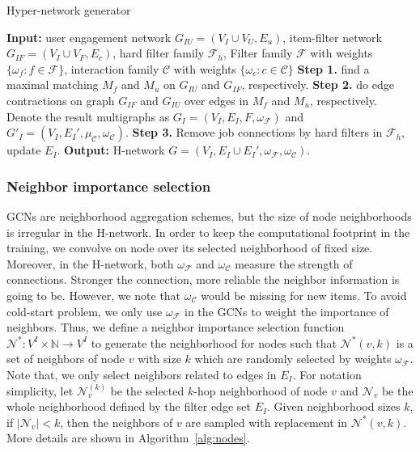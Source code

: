\documentclass[manuscript,screen,review]{acmart}
\newcommand\Fcal{\mathcal{F}}
\newcommand\Ucal{\mathcal{U}}
\newcommand{\ubf}{\bm{u}}
\newcommand{\Ccal}{\mathcal{C}}
\newcommand{\Ncal}{\mathcal{N}}
\begin{document}
\begin{algorithm}[h]
\caption{Hyper-network generator}
\begin{algorithmic}[1]\label{al:hnet}
\STATE \textbf{Input:} user engagement network $G_{IU}=(V_I\cup V_U,E_u)$,
item-filter network $G_{IF}=(V_I\cup V_F,E_c)$, 
hard filter family $\mathcal{F}_h$,
Filter family $\mathcal{F}$ with weights $\{\omega_f:f\in\mathcal{F}\}$,
interaction family $\mathcal{C}$ with weights $\{\omega_c:c\in\mathcal{C}\}$
\STATE \textbf{Step 1.} find a maximal matching $M_f$ and $M_u$ on $G_{IU}$ and $G_{IF}$, respectively.
\STATE \textbf{Step 2.} do edge contractions on graph $G_{IF}$ and $G_{IU}$ over edges in $M_f$ and $M_u$, respectively. Denote the result multigraphs as $G_I=(V_I,E_I,F,\omega_{\mathcal{F}})$ and $G'_I=(V_I,E_I',\mu_{\mathcal{C}},\omega_{\mathcal{C}})$.
\STATE \textbf{Step 3.} Remove job connections by hard filters in $\mathcal{F}_h$, update $E_I$.
\STATE 
\textbf{Output:} H-network $G=(V_I,E_I\cup E_I',\omega_{\mathcal{F}},\omega_{\mathcal{C}})$.
\end{algorithmic}
\end{algorithm}

\subsubsection{Neighbor importance selection} 
GCNs are neighborhood aggregation schemes, but the size of node neighborhoods is irregular in the H-network. In order to keep the computational footprint in the training, we convolve on node over its selected  neighborhood of fixed size. Moreover, in the H-network, both $\omega_{\Fcal}$ and $\omega_{\Ccal}$ measure the strength of connections. Stronger the connection, more reliable the neighbor information is going to be.
However, we note that $\omega_{\Ccal}$ would be missing for new items.
To avoid cold-start problem, we only use $\omega_{\Fcal}$ in the GCNs to weight the importance of neighbors.
Thus, we define a neighbor importance selection function $\Ncal^*: V^I\times\mathbb{N}\to V^I$ to generate the neighborhood for nodes such that $\Ncal^*(v,k)$ is a set of neighbors of node $v$ with size $k$ which are randomly selected by weights $\omega_{\Fcal}$.
Note that, we only select neighbors related to edges in $E_I$.  For notation simplicity, let $\Ncal^{(k)}_v$ be the selected $k$-hop neighborhood of node $v$ and $\Ncal_v$ be the whole neighborhood defined by the filter edge set $E_I$. Given neighborhood sizes $k$,  if $|\Ncal_v|< k$, then the neighbors of $v$ are sampled with replacement in $\Ncal^*(v,k)$. 
More details are shown in Algorithm~\ref{alg:nodes}. 
\end{document}
